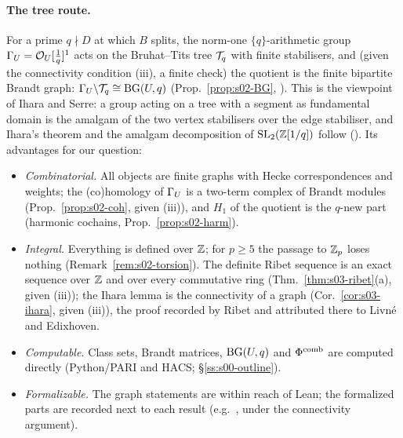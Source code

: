 \paragraph{The tree route.} For a prime $q\nmid D$ at which $B$ splits, the norm-one $\{q\}$-arithmetic group $\Gamma_U=\mathcal{O}_U[\frac1q]^1$
acts on the Bruhat--Tits tree $\mathcal{T}_q$ with finite stabilisers, and (given the connectivity condition (iii), a finite check) the
quotient is the finite bipartite Brandt graph: $\Gamma_U\backslash\mathcal{T}_q\cong\mathrm{BG}(U,q)$ (Prop.~\ref{prop:s02-BG}, \stproved). This is the
viewpoint of Ihara and Serre: a group acting on a tree with a segment as fundamental domain is the amalgam of the two vertex
stabilisers over the edge stabiliser, and Ihara's theorem and the amalgam decomposition of $\mathrm{SL}_2(\mathbb{Z}[1/q])$ follow
\cite[Ch.~II, \S1.4, Thm.~3, Cor.~1, p.~79--81]{Se} (\stcited). Its advantages for our question:
\begin{itemize}
\item \emph{Combinatorial.} All objects are finite graphs with Hecke correspondences and weights; the (co)homology of $\Gamma_U$ is a
  two-term complex of Brandt modules (Prop.~\ref{prop:s02-coh}, \stpmc{} given (iii)), and $H_1$ of the quotient is the $q$-new part
  (harmonic cochains, Prop.~\ref{prop:s02-harm}).
\item \emph{Integral.} Everything is defined over $\mathbb{Z}$; for $p\ge5$ the passage to $\mathbb{Z}_p$ loses nothing
  (Remark~\ref{rem:s02-torsion}). The definite Ribet sequence is an exact sequence over $\mathbb{Z}$ and over every commutative ring
  (Thm.~\ref{thm:s03-ribet}(a), \stproved{} given (iii)); the Ihara lemma is the connectivity of a graph
  (Cor.~\ref{cor:s03-ihara}, \stproved{} given (iii)), the proof recorded by Ribet \cite[Rem.~3.18]{Ri90} and attributed there to
  Livn\'e and Edixhoven.
\item \emph{Computable.} Class sets, Brandt matrices, $\mathrm{BG}(U,q)$ and $\Phi^{\mathrm{comb}}$ are computed directly (Python/PARI and HACS;
  \S\ref{ss:s00-outline}).
\item \emph{Formalizable.} The graph statements are within reach of Lean; the formalized parts are recorded next to each result
  (e.g.\ , under the connectivity argument).
\end{itemize}

